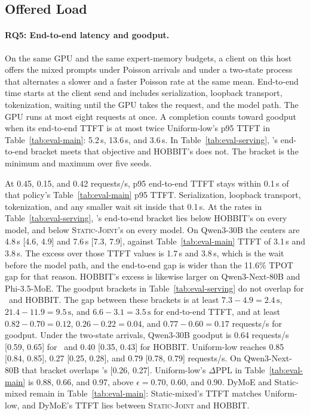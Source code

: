 

\subsection{Offered Load}
\label{sec:eval-serving}

\paragraph{RQ5: End-to-end latency and goodput.}
On the same GPU and the same expert-memory budgets, a client on this host offers the mixed prompts under Poisson arrivals and under a two-state process that alternates a slower and a faster Poisson rate at the same mean. End-to-end time starts at the client send and includes serialization, loopback transport, tokenization, waiting until the GPU takes the request, and the model path. The GPU runs at most eight requests at once. A completion counts toward goodput when its end-to-end TTFT is at most twice Uniform-low's p95 TTFT in Table~\ref{tab:eval-main}: 5.2\,s, 13.6\,s, and 3.6\,s. In Table~\ref{tab:eval-serving}, \systemname's end-to-end bracket meets that objective and HOBBIT's does not. The bracket is the minimum and maximum over five seeds.



At 0.45, 0.15, and 0.42 requests/s, p95 end-to-end TTFT stays within 0.1\,s of that policy's Table~\ref{tab:eval-main} p95 TTFT. Serialization, loopback transport, tokenization, and any smaller wait sit inside that 0.1\,s. At the rates in Table~\ref{tab:eval-serving}, \systemname's end-to-end bracket lies below HOBBIT's on every model, and below \textsc{Static-Joint}'s on every model. On Qwen3-30B the centers are 4.8\,s [4.6, 4.9] and 7.6\,s [7.3, 7.9], against Table~\ref{tab:eval-main} TTFT of 3.1\,s and 3.8\,s. The excess over those TTFT values is 1.7\,s and 3.8\,s, which is the wait before the model path, and the end-to-end gap is wider than the 11.6\% TPOT gap for that reason. HOBBIT's excess is likewise larger on Qwen3-Next-80B and Phi-3.5-MoE. The goodput brackets in Table~\ref{tab:eval-serving} do not overlap for \systemname\ and HOBBIT. The gap between these brackets is at least \(7.3-4.9=2.4\,\mathrm{s}\), \(21.4-11.9=9.5\,\mathrm{s}\), and \(6.6-3.1=3.5\,\mathrm{s}\) for end-to-end TTFT, and at least \(0.82-0.70=0.12\), \(0.26-0.22=0.04\), and \(0.77-0.60=0.17\) requests/s for goodput. Under the two-state arrivals, Qwen3-30B goodput is 0.64 requests/s [0.59, 0.65] for \systemname\ and 0.40 [0.35, 0.43] for HOBBIT. Uniform-low reaches 0.85 [0.84, 0.85], 0.27 [0.25, 0.28], and 0.79 [0.78, 0.79] requests/s. On Qwen3-Next-80B that bracket overlaps \systemname's [0.26, 0.27]. Uniform-low's \(\Delta\mathrm{PPL}\) in Table~\ref{tab:eval-main} is 0.88, 0.66, and 0.97, above \(\epsilon=0.70\), \(0.60\), and \(0.90\). DyMoE and Static-mixed remain in Table~\ref{tab:eval-main}: Static-mixed's TTFT matches Uniform-low, and DyMoE's TTFT lies between \textsc{Static-Joint} and HOBBIT.
